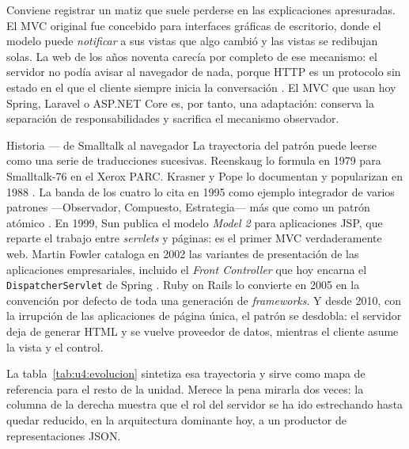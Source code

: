 \documentclass[11pt,a4paper,openany]{book}
\begin{document}
Conviene registrar un matiz que suele perderse en las explicaciones apresuradas. El MVC original fue concebido para interfaces gráficas de escritorio, donde el modelo puede \emph{notificar} a sus vistas que algo cambió y las vistas se redibujan solas. La web de los años noventa carecía por completo de ese mecanismo: el servidor no podía avisar al navegador de nada, porque HTTP es un protocolo sin estado en el que el cliente siempre inicia la conversación \cite{rfc9110}. El MVC que usan hoy Spring, Laravel o ASP.NET Core es, por tanto, una adaptación: conserva la separación de responsabilidades y sacrifica el mecanismo observador.

\begin{cajahistoria}{Historia --- de Smalltalk al navegador}
	La trayectoria del patrón puede leerse como una serie de traducciones sucesivas. Reenskaug lo formula en 1979 para Smalltalk-76 en el Xerox PARC. Krasner y Pope lo documentan y popularizan en 1988 \cite{krasner1988cookbook}. La banda de los cuatro lo cita en 1995 como ejemplo integrador de varios patrones ---Observador, Compuesto, Estrategia--- más que como un patrón atómico \cite{gamma1995patterns}. En 1999, Sun publica el modelo \emph{Model 2} para aplicaciones JSP, que reparte el trabajo entre \emph{servlets} y páginas: es el primer MVC verdaderamente web. Martin Fowler cataloga en 2002 las variantes de presentación de las aplicaciones empresariales, incluido el \emph{Front Controller} que hoy encarna el \texttt{DispatcherServlet} de Spring \cite{fowler2002patterns}. Ruby on Rails lo convierte en 2005 en la convención por defecto de toda una generación de \emph{frameworks}. Y desde 2010, con la irrupción de las aplicaciones de página única, el patrón se desdobla: el servidor deja de generar HTML y se vuelve proveedor de datos, mientras el cliente asume la vista y el control.
\end{cajahistoria}

La tabla~\ref{tab:u4:evolucion} sintetiza esa trayectoria y sirve como mapa de referencia para el resto de la unidad. Merece la pena mirarla dos veces: la columna de la derecha muestra que el rol del servidor se ha ido estrechando hasta quedar reducido, en la arquitectura dominante hoy, a un productor de representaciones JSON.
\end{document}
